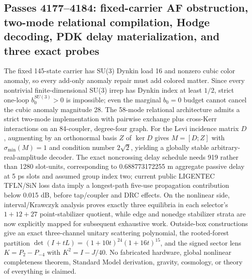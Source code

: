 \subsection*{Passes 4177--4184: fixed-carrier AF obstruction, two-mode relational compilation, Hodge decoding, PDK delay materialization, and three exact probes}
The fixed 145-state carrier has SU(3) Dynkin load 16 and nonzero cubic color anomaly, so every add-only anomaly repair must add colored matter. Since every nontrivial finite-dimensional SU(3) irrep has Dynkin index at least $1/2$, strict one-loop $b_0^{SU(3)}>0$ is impossible; even the marginal $b_0=0$ budget cannot cancel the cubic anomaly magnitude 28. The 58-mode relational architecture admits a strict two-mode implementation with pairwise exchange plus cross-Kerr interactions on an 84-coupler, degree-four graph. For the Levi incidence matrix $D$, augmenting by an orthonormal basis $Z$ of $\ker D$ gives $M=[D;Z]$ with $\sigma_{\min}(M)=1$ and condition number $2\sqrt2$, yielding a globally stable arbitrary-real-amplitude decoder. The exact noncrossing delay schedule needs 919 rather than 1280 slot-units, corresponding to 0.688773172255 m aggregate passive delay at 5 ps slots and assumed group index two; current public LIGENTEC TFLN/SiN loss data imply a longest-path five-use propagation contribution below 0.015 dB, before tap/coupler and DRC effects. On the nonlinear side, interval/Krawczyk analysis proves exactly three equilibria in each selector's $1+12+27$ point-stabilizer quotient, while edge and nonedge stabilizer strata are now explicitly mapped for subsequent exhaustive work. Outside-box constructions give an exact three-channel unitary scattering polynomial, the rooted-forest partition $\det(I+tL)=(1+10t)^{24}(1+16t)^{15}$, and the signed sector lens $K=P_2-P_{-4}$ with $K^2=I-J/40$. No fabricated hardware, global nonlinear completeness theorem, Standard Model derivation, gravity, cosmology, or theory of everything is claimed.

